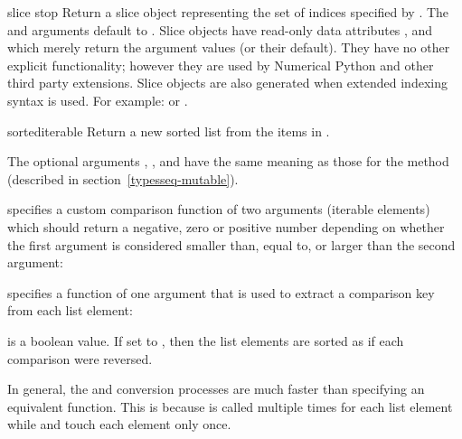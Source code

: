\begin{funcdesc}{slice}{ stop}
  Return a slice object representing the set of indices specified by
  .  The 
  and  arguments default to .  Slice objects have
  read-only data attributes ,  and
   which merely return the argument values (or their
  default).  They have no other explicit functionality; however they
  are used by Numerical Python and other third
  party extensions.  Slice objects are also generated when extended
  indexing syntax is used.  For example:  or
  .
\end{funcdesc}

\begin{funcdesc}{sorted}{iterable}
  Return a new sorted list from the items in .

  The optional arguments , , and  have
  the same meaning as those for the  method
  (described in section~\ref{typesseq-mutable}).

   specifies a custom comparison function of two arguments
  (iterable elements) which should return a negative, zero or positive
  number depending on whether the first argument is considered smaller
  than, equal to, or larger than the second argument:
     
   specifies a function of one argument that is used to
     extract a comparison key from each list element:

   is a boolean value.  If set to , then the
     list elements are sorted as if each comparison were reversed.

  In general, the  and  conversion processes are
  much faster than specifying an equivalent  function.  This is
  because  is called multiple times for each list element while
   and  touch each element only once.

\end{funcdesc}

